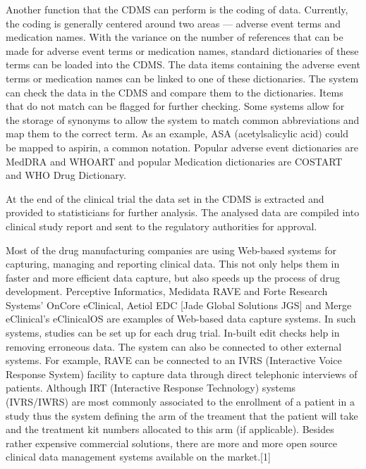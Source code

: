Another function that the CDMS can perform is the coding of data. Currently, the coding is generally centered around two areas — adverse event terms and medication names. With the variance on the number of references that can be made for adverse event terms or medication names, standard dictionaries of these terms can be loaded into the CDMS. The data items containing the adverse event terms or medication names can be linked to one of these dictionaries. The system can check the data in the CDMS and compare them to the dictionaries. Items that do not match can be flagged for further checking. Some systems allow for the storage of synonyms to allow the system to match common abbreviations and map them to the correct term. As an example, ASA (acetylsalicylic acid) could be mapped to aspirin, a common notation. Popular adverse event dictionaries are MedDRA and WHOART and popular Medication dictionaries are COSTART and WHO Drug Dictionary.

At the end of the clinical trial the data set in the CDMS is extracted and provided to statisticians for further analysis. The analysed data are compiled into clinical study report and sent to the regulatory authorities for approval.

Most of the drug manufacturing companies are using Web-based systems for capturing, managing and reporting clinical data. This not only helps them in faster and more efficient data capture, but also speeds up the process of drug development. Perceptive Informatics, Medidata RAVE and Forte Research Systems' OnCore eClinical, Aetiol EDC [Jade Global Solutions {JGS}] and Merge eClinical's eClinicalOS are examples of Web-based data capture systems. In such systems, studies can be set up for each drug trial. In-built edit checks help in removing erroneous data. The system can also be connected to other external systems. For example, RAVE can be connected to an IVRS (Interactive Voice Response System) facility to capture data through direct telephonic interviews of patients. Although IRT (Interactive Response Technology) systems (IVRS/IWRS) are most commonly associated to the enrollment of a patient in a study thus the system defining the arm of the treament that the patient will take and the treatment kit numbers allocated to this arm (if applicable). Besides rather expensive commercial solutions, there are more and more open source clinical data management systems available on the market.[1]
